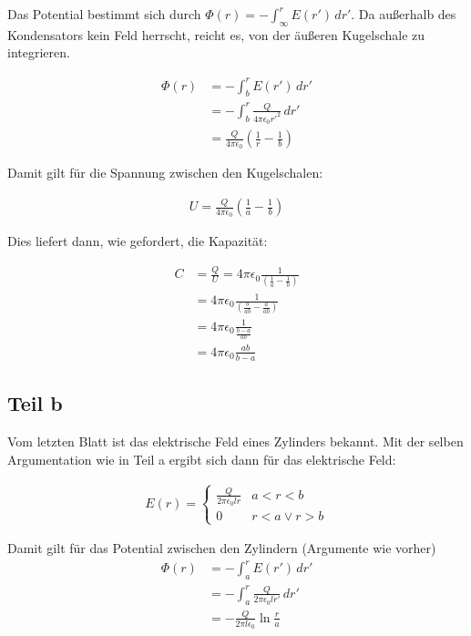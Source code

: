 \documentclass[a4paper,german,12pt,smallheadings]{scrartcl}
\begin{document}
Das Potential bestimmt sich durch $\Phi(r) = -\int_\infty^r E(r')\, dr'$. Da
außerhalb des Kondensators kein Feld herrscht, reicht es, von der äußeren
Kugelschale zu integrieren.

\begin{align*}
  \Phi(r) &= -\int_{b}^r E(r')\, dr' \\
          &= -\int_{b}^r \frac{Q}{4 \pi \epsilon_0 r'^2}\, dr' \\
          &= \frac{Q}{4\pi \epsilon_0} \left(\frac{1}{r}-\frac{1}{b}\right)
\end{align*}

Damit gilt für die Spannung zwischen den Kugelschalen:

\begin{align*}
  U = \frac{Q}{4\pi \epsilon_0} \left(\frac{1}{a}-\frac{1}{b}\right)
\end{align*}

Dies liefert dann, wie gefordert, die Kapazität:

\begin{align*}
  C &= \frac{Q}{U} =  4\pi \epsilon_0 \frac{1}{\left(\frac{1}{a}-\frac{1}{b}\right)} \\
    &=  4\pi \epsilon_0 \frac{1}{\left(\frac{b}{ab}-\frac{a}{ab}\right)} \\
    &=  4\pi \epsilon_0 \frac{1}{\frac{b-a}{ab}} \\
    &=  4\pi \epsilon_0 \frac{ab}{b-a}
\end{align*}

\subsection*{Teil b}
Vom letzten Blatt ist das elektrische Feld eines Zylinders bekannt. Mit der
selben Argumentation wie in Teil a ergibt sich dann für das elektrische Feld:

\begin{align*}
  E(r) = \left\{\begin{array}{ll} \frac{Q}{2 \pi \epsilon_0 lr} & a < r < b \\
         0 & r < a \lor r > b\end{array}\right.
\end{align*}

Damit gilt für das Potential zwischen den Zylindern (Argumente wie vorher)
\begin{align*}
  \Phi(r) &= -\int_{a}^r E(r')\, dr' \\
          &= -\int_{a}^r \frac{Q}{2 \pi \epsilon_0 l r'}\, dr' \\
          &= -\frac{Q}{2 \pi l \epsilon_0} \ln \frac{r}{a}
\end{align*}
\end{document}
